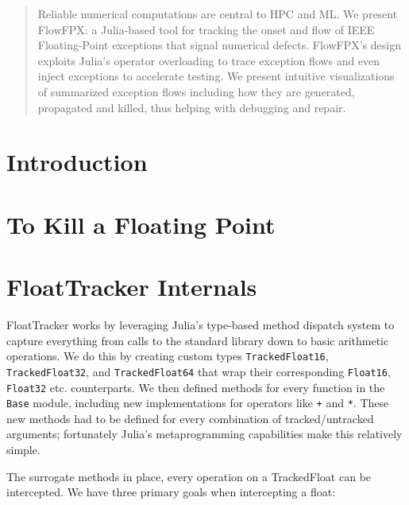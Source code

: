 \documentclass{juliacon}
\begin{document}

\maketitle

\begin{abstract}
  Reliable numerical computations are central to HPC and ML.
  We present FlowFPX: a Julia-based tool for tracking the onset and flow of IEEE Floating-Point exceptions that signal numerical defects.
  FlowFPX's design exploits Julia's operator overloading to trace exception flows and even inject exceptions to accelerate testing.
  We present intuitive visualizations of summarized exception flows including how they are generated, propagated and killed, thus helping with debugging and repair.
\end{abstract}

\section{Introduction}

\section{To Kill a Floating Point}


\section{FloatTracker Internals}

FloatTracker works by leveraging Julia's type-based method dispatch system to capture everything from calls to the standard library down to basic arithmetic operations.
We do this by creating custom types \texttt{TrackedFloat16}, \texttt{TrackedFloat32}, and \texttt{TrackedFloat64} that wrap their corresponding \texttt{Float16}, \texttt{Float32} etc. counterparts.
We then defined methods for every function in the \texttt{Base} module, including new implementations for operators like \texttt{+} and \texttt{*}.
These new methods had to be defined for every combination of tracked/untracked arguments;
fortunately Julia's metaprogramming capabilities make this relatively simple.

The surrogate methods in place, every operation on a TrackedFloat can be intercepted.
We have three primary goals when intercepting a float:
\end{document}
